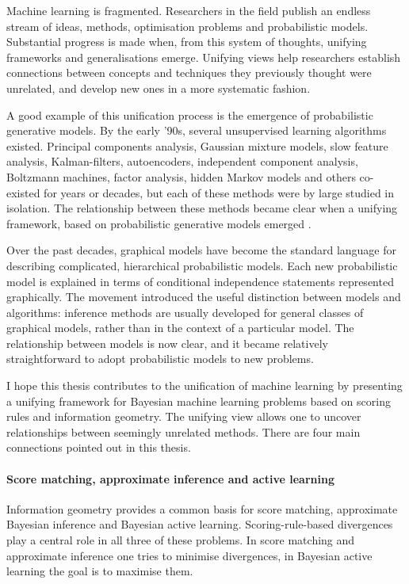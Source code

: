 
Machine learning is fragmented. Researchers in the field publish an endless stream of ideas, methods, optimisation problems and probabilistic models. Substantial progress is made when, from this system of thoughts, unifying frameworks and generalisations emerge. Unifying views help researchers establish connections between concepts and techniques they previously thought were unrelated, and develop new ones in a more systematic fashion.

A good example of this unification process is the emergence of probabilistic generative models. By the early '90s, several unsupervised learning algorithms existed. Principal components analysis, Gaussian mixture models, slow feature analysis, Kalman-filters, autoencoders, independent component analysis, Boltzmann machines, factor analysis, hidden Markov models and others co-existed for years or decades, but each of these methods were by large studied in isolation. The relationship between these methods became clear when a unifying framework, based on probabilistic generative models emerged \citep{Lauritzen1996,Roweis1999,Tipping1999,Turner2007}.

Over the past decades, graphical models \citep{Lauritzen1996} have become the standard language for describing complicated, hierarchical probabilistic models. Each new probabilistic model is explained in terms of conditional independence statements represented graphically. The movement introduced the useful distinction between models and algorithms: inference methods are usually developed for general classes of graphical models, rather than in the context of a particular model. The relationship between models is now clear, and it became relatively straightforward to adopt probabilistic models to new problems.	

I hope this thesis contributes to the unification of machine learning by presenting a unifying framework for Bayesian machine learning problems based on scoring rules and information geometry. The unifying view allows one to uncover relationships between seemingly unrelated methods. There are four main connections pointed out in this thesis.

\paragraph{Score matching, approximate inference and active learning} Information geometry provides a common basis for score matching, approximate Bayesian inference and Bayesian active learning. Scoring-rule-based divergences play a central role in all three of these problems. In score matching and approximate inference one tries to minimise divergences, in Bayesian active learning the goal is to maximise them.

